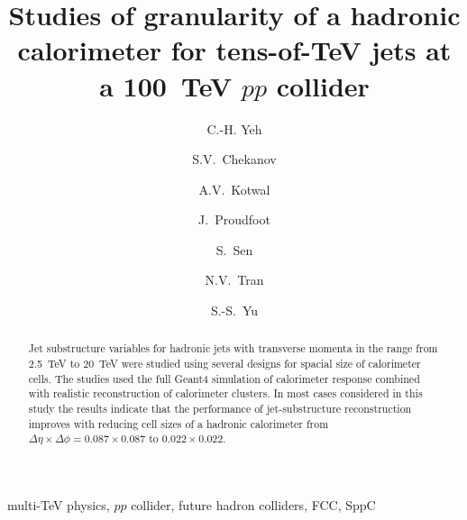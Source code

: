 \documentclass[final,1p,11pt]{elsarticle}
\begin{document}
\begin{frontmatter}

\title{
Studies of granularity of a hadronic calorimeter for tens-of-TeV jets  at a 100~TeV $pp$ collider 
}

\author[add3]{C.-H. Yeh}

\author[add1]{S.V.~Chekanov}

\author[addDuke,add2]{A.V.~Kotwal}

\author[add1]{J.~Proudfoot}

\author[addDuke]{S.~Sen}

\author[add2]{N.V.~Tran}

\author[add3]{S.-S.~Yu}

\address[add3]{
Department of Physics, National Central University, Chung-Li, Taoyuan City 32001, Taiwan
}

\address[add1]{
HEP Division, Argonne National Laboratory,
9700 S.~Cass Avenue,
Argonne, IL 60439, USA. 
}

\address[addDuke]{
Department of Physics, Duke University, USA
}

\address[add2]{
Fermi National Accelerator Laboratory
}

\address[addMSU]{
Department of Physics, Michigan State University, 220
Trowbridge Road, East Lansing, MI 48824 
}




\begin{abstract}
Jet substructure variables for hadronic jets with transverse momenta in the range from 2.5~TeV to 20~TeV
were studied using several designs for spacial size of calorimeter cells. The studies  used 
the full Geant4 simulation 
of calorimeter response combined with realistic reconstruction of calorimeter clusters.
In most cases considered in this study the results indicate that the performance of jet-substructure 
reconstruction improves with reducing cell sizes of a hadronic calorimeter 
from $\Delta \eta \times \Delta \phi = 0.087\times0.087$
to $0.022\times0.022$. 


\end{abstract}

\begin{keyword}
multi-TeV physics, $pp$ collider, future hadron colliders, FCC, SppC
\end{keyword}



\end{frontmatter}
\end{document}
